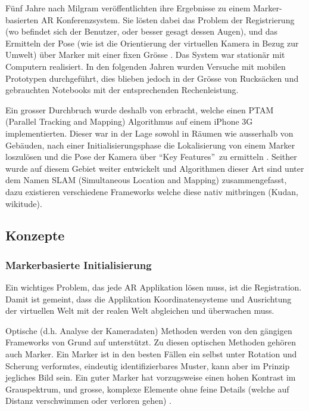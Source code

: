\documentclass[a4paper]{scrreprt}
\begin{document}
Fünf Jahre nach Milgram veröffentlichten \citeauthor{Kato1999} ihre Ergebnisse zu einem Marker-basierten AR Konferenzsystem. Sie lösten dabei das Problem der Registrierung (wo befindet sich der Benutzer, oder besser gesagt dessen Augen), und das Ermitteln der Pose (wie ist die Orientierung der virtuellen Kamera in Bezug zur Umwelt) über Marker mit einer fixen Grösse \parencite{Kato1999}. Das System war stationär mit Computern realisiert. In den folgenden Jahren wurden Versuche mit  mobilen Prototypen durchgeführt, dies blieben jedoch in der Grösse von Rucksäcken und gebrauchten Notebooks mit der entsprechenden Rechenleistung.

Ein grosser Durchbruch wurde deshalb von \citeauthor{Klein2009} erbracht, welche einen PTAM (Parallel Tracking and Mapping) Algorithmus auf einem iPhone 3G implementierten. Dieser war in der Lage sowohl in Räumen wie ausserhalb von Gebäuden, nach einer Initialisierungsphase die Lokalisierung von einem Marker loszulösen und die Pose der Kamera über \textquotedblleft Key Features\textquotedblright\ zu ermitteln \parencite{Klein2009}. Seither wurde auf diesem Gebiet weiter entwickelt und Algorithmen dieser Art sind unter dem Namen SLAM (Simultaneous Location and Mapping) zusammengefasst, dazu existieren verschiedene Frameworks welche diese nativ mitbringen (Kudan, wikitude).

\subsection{Konzepte}

\subsubsection{Markerbasierte Initialisierung}
Ein wichtiges Problem, das jede AR Applikation lösen muss, ist die Registration. Damit ist gemeint, dass die Applikation Koordinatensysteme und Ausrichtung der virtuellen Welt mit der realen Welt abgleichen und überwachen muss.

Optische (d.h. Analyse der Kameradaten) Methoden werden von den gängigen Frameworks von Grund auf unterstützt. Zu diesen optischen Methoden gehören auch Marker. Ein Marker ist in den besten Fällen ein selbst unter Rotation und Scherung verformtes, eindeutig identifizierbares Muster, kann aber im Prinzip jegliches Bild sein. Ein guter Marker hat vorzugsweise einen hohen Kontrast im Grauspektrum, und grosse, komplexe Elemente ohne feine Details (welche auf Distanz verschwimmen oder verloren gehen) \cite{Kudan2016}.
\end{document}
